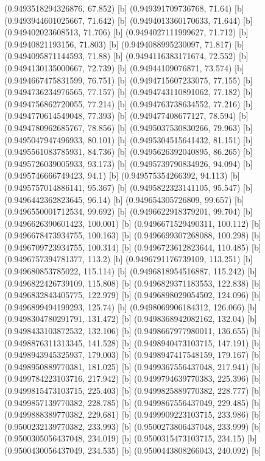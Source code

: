 {{{(0.9493518294326876, 67.852) [b] 
(0.949391709736768, 71.64) [b] 
(0.9493944601025667, 71.642) [b] 
(0.9494013360170633, 71.644) [b] 
(0.949402023608513, 71.706) [b] 
(0.9494027111999627, 71.712) [b] 
(0.94940821193156, 71.803) [b] 
(0.9494088995230097, 71.817) [b] 
(0.9494095871144593, 71.88) [b] 
(0.9494116383171674, 72.552) [b] 
(0.9494130135000667, 72.739) [b] 
(0.94944109076871, 73.574) [b] 
(0.9494667475831599, 76.751) [b] 
(0.9494715607233075, 77.155) [b] 
(0.9494736234976565, 77.157) [b] 
(0.9494743110891062, 77.182) [b] 
(0.9494756862720055, 77.214) [b] 
(0.9494763738634552, 77.216) [b] 
(0.9494770614549048, 77.393) [b] 
(0.949477408677127, 78.594) [b] 
(0.9494780962685767, 78.856) [b] 
(0.9495037530830266, 79.963) [b] 
(0.9495047947496933, 80.101) [b] 
(0.9495304515641432, 81.151) [b] 
(0.9495561083785931, 84.736) [b] 
(0.9495626392040895, 86.265) [b] 
(0.9495726039005933, 93.173) [b] 
(0.9495739790834926, 94.094) [b] 
(0.9495746666749423, 94.1) [b] 
(0.949575354266392, 94.113) [b] 
(0.9495757014886141, 95.367) [b] 
(0.9495822323141105, 95.547) [b] 
(0.9496442362823645, 96.14) [b] 
(0.949654305726809, 99.657) [b] 
(0.9496550001712534, 99.692) [b] 
(0.9496622918379201, 99.704) [b] 
(0.9496626390601423, 100.001) [b] 
(0.9496671529490311, 100.112) [b] 
(0.9496678473934755, 100.163) [b] 
(0.9496699307268088, 100.298) [b] 
(0.9496709723934755, 100.314) [b] 
(0.9496723612823644, 110.485) [b] 
(0.9496757394781377, 113.2) [b] 
(0.9496791176739109, 113.251) [b] 
(0.949680853785022, 115.114) [b] 
(0.9496818954516887, 115.242) [b] 
(0.9496822426739109, 115.808) [b] 
(0.9496829371183553, 122.838) [b] 
(0.9496832843405775, 122.979) [b] 
(0.9496898029054502, 124.096) [b] 
(0.9496899494199293, 125.74) [b] 
(0.9498069906184312, 126.066) [b] 
(0.9498304780291791, 131.472) [b] 
(0.9498368942082162, 132.04) [b] 
(0.9498433103872532, 132.106) [b] 
(0.9498667977980011, 136.655) [b] 
(0.9498876311313345, 141.528) [b] 
(0.9498940473103715, 147.191) [b] 
(0.9498943945325937, 179.003) [b] 
(0.9498947417548159, 179.167) [b] 
(0.9498950889770381, 181.025) [b] 
(0.9499367556437048, 217.941) [b] 
(0.9499784223103716, 217.942) [b] 
(0.9499794639770383, 225.396) [b] 
(0.9499815473103715, 225.403) [b] 
(0.9499825889770382, 228.777) [b] 
(0.9499857139770382, 228.785) [b] 
(0.9499867556437049, 229.485) [b] 
(0.9499888389770382, 229.681) [b] 
(0.9499909223103715, 233.986) [b] 
(0.9500232139770382, 233.993) [b] 
(0.9500273806437048, 233.999) [b] 
(0.9500305056437048, 234.019) [b] 
(0.9500315473103715, 234.15) [b] 
(0.9500430056437049, 234.535) [b] 
(0.9500443808266043, 240.092) [b] 
}}}
